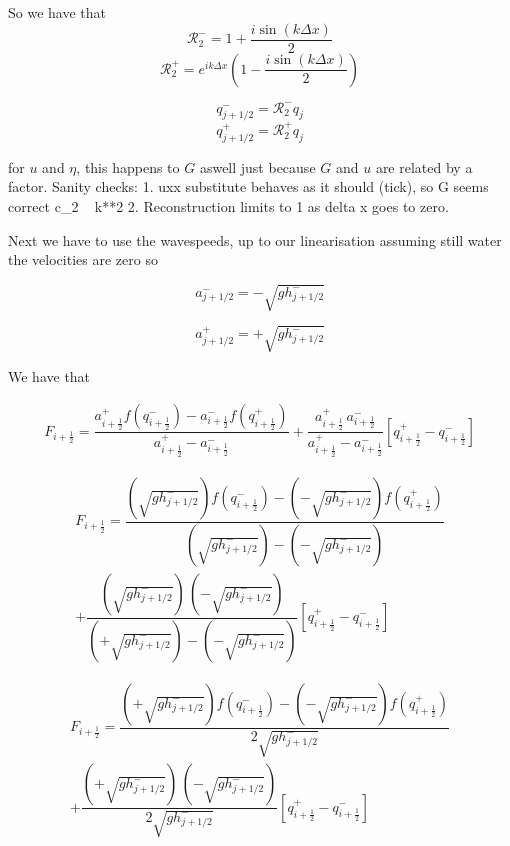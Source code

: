 \documentclass[12pt]{article}
\begin{document}
So we have that
\[\mathcal{R}_2^- = 1  + \frac{i\sin\left(k\Delta x\right)}{2}\]
\[\mathcal{R}_2^+ = e^{ik\Delta x}\left(1  - \frac{i\sin\left(k\Delta x\right)}{2} \right)\]

\[q^-_{j + 1/2} = \mathcal{R}_2^- q_j\]
\[q^+_{j + 1/2} = \mathcal{R}_2^+ q_j\]

for $u$ and $\eta$, this happens to $G$ aswell just because $G$ and $u$ are related by a factor. 
Sanity checks:
1. uxx substitute behaves as it should (tick), so G seems correct c_2 ~ k**2
2. Reconstruction limits to 1 as delta x goes to zero. 





Next we have to use the wavespeeds, up to our linearisation assuming still water the velocities are zero so

\[a^-_{j+ 1/2} =  - \sqrt{g h^-_{j + 1/2}}\]

\[a^+_{j+ 1/2} = + \sqrt{g h^-_{j + 1/2}}\]


We have that 

\begin{gather}\label{eq:HLL_flux}
F_{i+\frac{1}{2}} = \dfrac{a^+_{i+\frac{1}{2}} f\left(q^-_{i+\frac{1}{2}}\right) - a^-_{i+\frac{1}{2}} f\left(q^+_{i+\frac{1}{2}}\right)}{a^+_{i+\frac{1}{2}} - a^-_{i+\frac{1}{2}}}  + \dfrac{a^+_{i+\frac{1}{2}} \, a^-_{i+\frac{1}{2}}}{a^+_{i+\frac{1}{2}} - a^-_{i+\frac{1}{2}}} \left [ q^+_{i+\frac{1}{2}} - q^-_{i+\frac{1}{2}} \right ]
\end{gather}

\begin{multline}
F_{i+\frac{1}{2}} = \dfrac{\left(\sqrt{g h^-_{j + 1/2}}\right) f\left(q^-_{i+\frac{1}{2}}\right) - \left( - \sqrt{g h^-_{j + 1/2}}\right) f\left(q^+_{i+\frac{1}{2}}\right)}{\left(\sqrt{g h^-_{j + 1/2}}\right) - \left( - \sqrt{g h^-_{j + 1/2}}\right)} \\ + \dfrac{\left( \sqrt{g h^-_{j + 1/2}}\right) \, \left( - \sqrt{g h^-_{j + 1/2}}\right)}{\left( + \sqrt{g h^-_{j + 1/2}}\right) - \left( - \sqrt{g h^-_{j + 1/2}}\right)} \left [ q^+_{i+\frac{1}{2}} - q^-_{i+\frac{1}{2}} \right ]
\end{multline}

\begin{multline}
F_{i+\frac{1}{2}} = \dfrac{\left(+ \sqrt{g h^-_{j + 1/2}}\right) f\left(q^-_{i+\frac{1}{2}}\right) - \left( - \sqrt{g h^-_{j + 1/2}}\right) f\left(q^+_{i+\frac{1}{2}}\right)}{ 2\sqrt{g h^-_{j + 1/2}}} \\ + \dfrac{\left( + \sqrt{g h^-_{j + 1/2}}\right) \, \left( - \sqrt{g h^-_{j + 1/2}}\right)}{{ 2\sqrt{g h^-_{j + 1/2}}}} \left [ q^+_{i+\frac{1}{2}} - q^-_{i+\frac{1}{2}} \right ]
\end{multline}
\end{document}
